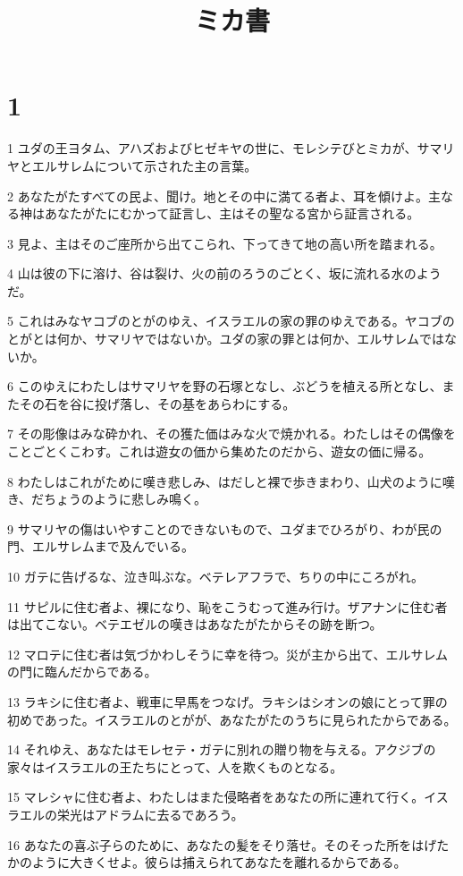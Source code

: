 

\title{ミカ書}


\chapter{1}

\par 1 ユダの王ヨタム、アハズおよびヒゼキヤの世に、モレシテびとミカが、サマリヤとエルサレムについて示された主の言葉。
\par 2 あなたがたすべての民よ、聞け。地とその中に満てる者よ、耳を傾けよ。主なる神はあなたがたにむかって証言し、主はその聖なる宮から証言される。
\par 3 見よ、主はそのご座所から出てこられ、下ってきて地の高い所を踏まれる。
\par 4 山は彼の下に溶け、谷は裂け、火の前のろうのごとく、坂に流れる水のようだ。
\par 5 これはみなヤコブのとがのゆえ、イスラエルの家の罪のゆえである。ヤコブのとがとは何か、サマリヤではないか。ユダの家の罪とは何か、エルサレムではないか。
\par 6 このゆえにわたしはサマリヤを野の石塚となし、ぶどうを植える所となし、またその石を谷に投げ落し、その基をあらわにする。
\par 7 その彫像はみな砕かれ、その獲た価はみな火で焼かれる。わたしはその偶像をことごとくこわす。これは遊女の価から集めたのだから、遊女の価に帰る。
\par 8 わたしはこれがために嘆き悲しみ、はだしと裸で歩きまわり、山犬のように嘆き、だちょうのように悲しみ鳴く。
\par 9 サマリヤの傷はいやすことのできないもので、ユダまでひろがり、わが民の門、エルサレムまで及んでいる。
\par 10 ガテに告げるな、泣き叫ぶな。ベテレアフラで、ちりの中にころがれ。
\par 11 サピルに住む者よ、裸になり、恥をこうむって進み行け。ザアナンに住む者は出てこない。ベテエゼルの嘆きはあなたがたからその跡を断つ。
\par 12 マロテに住む者は気づかわしそうに幸を待つ。災が主から出て、エルサレムの門に臨んだからである。
\par 13 ラキシに住む者よ、戦車に早馬をつなげ。ラキシはシオンの娘にとって罪の初めであった。イスラエルのとがが、あなたがたのうちに見られたからである。
\par 14 それゆえ、あなたはモレセテ・ガテに別れの贈り物を与える。アクジブの家々はイスラエルの王たちにとって、人を欺くものとなる。
\par 15 マレシャに住む者よ、わたしはまた侵略者をあなたの所に連れて行く。イスラエルの栄光はアドラムに去るであろう。
\par 16 あなたの喜ぶ子らのために、あなたの髪をそり落せ。そのそった所をはげたかのように大きくせよ。彼らは捕えられてあなたを離れるからである。

